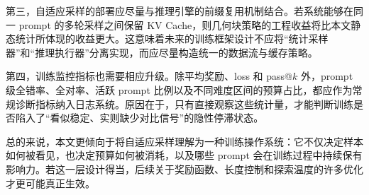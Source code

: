 第三，自适应采样的部署应尽量与推理引擎的前缀复用机制结合。若系统能够在同一 prompt 的多轮采样之间保留 KV Cache，则几何块策略的工程收益将比本文静态统计所体现的收益更大。这意味着未来的训练框架设计不应将“统计采样器”和“推理执行器”分离实现，而应尽量构造统一的数据流与缓存策略。

第四，训练监控指标也需要相应升级。除平均奖励、loss 和 pass@$k$ 外，prompt 级全错率、全对率、活跃 prompt 比例以及不同难度区间的预算占比，都应作为常规诊断指标纳入日志系统。原因在于，只有直接观察这些统计量，才能判断训练是否陷入了“看似稳定、实则缺少对比信号”的隐性停滞状态。

总的来说，本文更倾向于将自适应采样理解为一种训练操作系统：它不仅决定样本如何被看见，也决定预算如何被消耗，以及哪些 prompt 会在训练过程中持续保有影响力。若这一层设计得当，后续关于奖励函数、长度控制和探索温度的许多优化才更可能真正生效。
